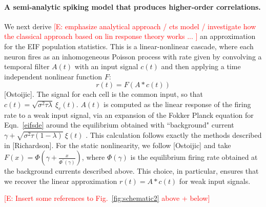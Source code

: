\documentclass[%
 reprint,
 twocolumn,
 amsmath,amssymb,
 aps,
floatfix,
]{revtex4}
\newcommand{\Ecomment}[1]{\textcolor{red}{[E: #1]}}
\begin{document}
\paragraph*{A semi-analytic spiking model that produces higher-order correlations.}  We next derive \Ecomment{emphasize analytical approach / cts model / investigate how the classical approach based on lin response theory works ... } an approximation for the EIF population statistics.  This is a linear-nonlinear cascade, where each neuron fires as an inhomogeneous Poisson process with rate given by convolving a temporal filter $A(t)$ with an input signal $c(t)$ and then applying a time independent nonlinear function $F$:   
\begin{equation}
r(t) = F\left(A * c(t) \right) \nonumber
\end{equation}
[Ostoijic].  The signal for each cell is the common input, so that $c(t) = \sqrt{\sigma^2 \tau \lambda}~\xi_c(t)$.  $A(t)$ is computed as the linear response of the firing rate to a weak input signal, via an expansion of the Fokker Planck equation for Eqn.~\eqref{eifsde} around the equilibrium obtained with ``background" current $\gamma+ \sqrt{\sigma^2 \tau (1-\lambda)}~\xi(t)$ .  This calculation follows exactly the methods described in [Richardson].  For the static nonlinearity, we follow [Ostoijic] and take $F(x) = \Phi\left( \gamma + \frac{x}{\Phi^\prime(\gamma)}\right)$, where $\Phi\left( \gamma \right)$ is the equilibrium firing rate obtained at the background currents described above.  This choice, in particular, ensures that we recover the linear approximation $r(t) = A * c(t)$ for weak input signals.

\Ecomment{Insert some references to Fig.~\ref{fig:schematic2} above + below}
\end{document}
